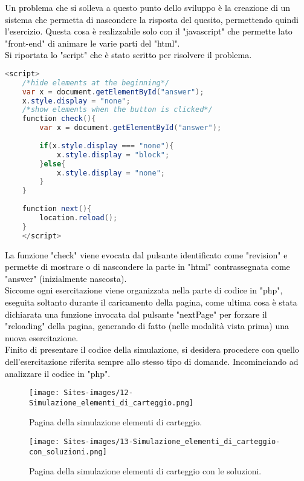 \raggedright
\textcolor{black}{Un problema che si solleva a questo punto dello sviluppo è la creazione di un sistema che permetta di nascondere la risposta del quesito, permettendo quindi l'esercizio. Questa cosa è realizzabile solo con il "javascript" che permette lato "front-end" di animare le varie parti del "html".\\
Si riportata lo "script" che è stato scritto per risolvere il problema.}\\

\begin{lstlisting}[language=java]
	<script>
	/*hide elements at the beginning*/
	var x = document.getElementById("answer");
	x.style.display = "none";
	/*show elements when the button is clicked*/
	function check(){
		var x = document.getElementById("answer");
		
		if(x.style.display === "none"){
			x.style.display = "block";
		}else{
			x.style.display = "none";
		}	
	}
	
	function next(){
		location.reload();  
	}
	</script>
\end{lstlisting}

\raggedright
\textcolor{black}{La funzione "check" viene evocata dal pulsante identificato come "revision" e permette di mostrare o di nascondere la parte in "html" contrassegnata come "answer" (inizialmente nascosta).\\
Siccome ogni esercitazione viene organizzata nella parte di codice in "php", eseguita soltanto durante il caricamento della pagina, come ultima cosa è stata dichiarata una funzione invocata dal pulsante "nextPage" per forzare il "reloading" della pagina, generando di fatto (nelle modalità vista prima) una nuova esercitazione.}\\
\vspace*{2mm}
\textcolor{black}{Finito di presentare il codice della simulazione, si desidera procedere con quello dell'esercitazione riferita sempre allo stesso tipo di domande. Incominciando ad analizzare il codice in "php"}.


\begin{figure}[H]
	\begin{center}
		\texttt{[image: Sites-images/12-Simulazione\_elementi\_di\_carteggio.png]}
		\caption{Pagina della simulazione elementi di carteggio.}
	\end{center}
\end{figure}
\vspace*{-1cm}
\begin{figure}[H]
	\begin{center}
		\texttt{[image: Sites-images/13-Simulazione\_elementi\_di\_carteggio-con\_soluzioni.png]}
		\caption{Pagina della simulazione elementi di carteggio con le soluzioni.}
	\end{center}
\end{figure}

